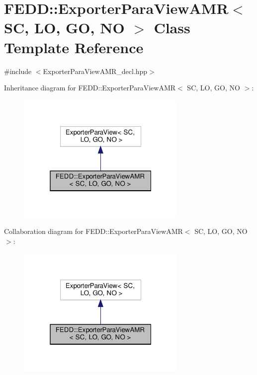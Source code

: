\hypertarget{classFEDD_1_1ExporterParaViewAMR}{}\section{F\+E\+DD\+:\+:Exporter\+Para\+View\+A\+MR$<$ SC, LO, GO, NO $>$ Class Template Reference}
\label{classFEDD_1_1ExporterParaViewAMR}


{\ttfamily \#include $<$Exporter\+Para\+View\+A\+M\+R\+\_\+decl.\+hpp$>$}



Inheritance diagram for F\+E\+DD\+:\+:Exporter\+Para\+View\+A\+MR$<$ SC, LO, GO, NO $>$\+:
\nopagebreak
\begin{figure}[H]
\begin{center}
\leavevmode
\includegraphics[width=232pt]{classFEDD_1_1ExporterParaViewAMR__inherit__graph}
\end{center}
\end{figure}


Collaboration diagram for F\+E\+DD\+:\+:Exporter\+Para\+View\+A\+MR$<$ SC, LO, GO, NO $>$\+:
\nopagebreak
\begin{figure}[H]
\begin{center}
\leavevmode
\includegraphics[width=232pt]{classFEDD_1_1ExporterParaViewAMR__coll__graph}
\end{center}
\end{figure}
